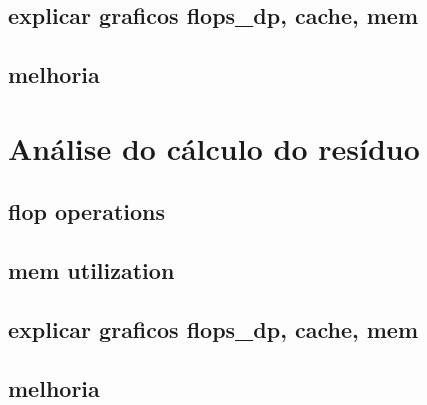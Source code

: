 \documentclass[12pt]{article}
\begin{document}
\subsection{explicar graficos flops\_dp, cache, mem}
\subsection{melhoria}

\section{Análise do cálculo do resíduo}\label{sec:residuo}
\subsection{flop operations}
\subsection{mem utilization}
\subsection{explicar graficos flops\_dp, cache, mem}
\subsection{melhoria}
\end{document}
